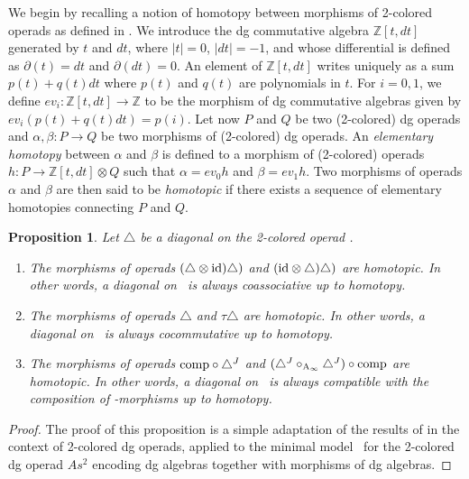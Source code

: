 \documentclass[twoside, 12pt]{amsart}
\newtheorem{proposition}[definition]{Proposition}
\theoremstyle{remark}
\begin{document}
We begin by recalling a notion of homotopy between morphisms of 2-colored operads as defined in \cite[Section 3.10]{MSS}. We introduce the dg commutative algebra $\mathbb{Z}[t,dt]$ generated by $t$ and $dt$, where $|t|=0$, $|dt|=-1$, and whose differential is defined as $\partial (t) = dt$ and $\partial (dt) = 0$. An element of $\mathbb{Z}[t,dt]$ writes uniquely as a sum $p(t)+q(t)dt$ where $p(t)$ and $q(t)$ are polynomials in $t$. For $i=0,1$, we define $ev_i : \mathbb{Z}[t,dt] \rightarrow \mathbb{Z}$ to be the morphism of dg commutative algebras given by $ev_i ( p(t) + q(t)dt ) = p(i)$.
Let now $P$ and $Q$ be two (2-colored) dg operads and $\alpha , \beta : P \rightarrow Q$ be two morphisms of (2-colored) dg operads.
An \textit{elementary homotopy} between $\alpha$ and $\beta$ is defined to a morphism of (2-colored) operads $h : P \rightarrow \mathbb{Z}[t,dt] \otimes Q$ such that $\alpha = ev_0 h$ and $\beta = ev_1 h$.
Two morphisms of operads $\alpha$ and $\beta$ are then said to be \textit{homotopic} if there exists a sequence of elementary homotopies connecting $P$ and $Q$.

\begin{proposition} \label{th:homotopy-properties}
Let $\triangle$ be a diagonal on the 2-colored operad \Ainfdeux . 
\begin{enumerate}
    \item The morphisms of operads $(\triangle \otimes \mathrm{id} ) \triangle)$ and $(\mathrm{id} \otimes \triangle) \triangle)$ are homotopic. In other words, a diagonal on \Ainfdeux\ is always coassociative up to homotopy.
    \item The morphisms of operads $\triangle$ and $\tau \triangle$ are homotopic. In other words, a diagonal on \Ainfdeux\ is always cocommutative up to homotopy.
    \item The morphisms of operads $\mathrm{comp}  \circ \triangle^{J}$ and $( \triangle^{J} \circ_{\mathrm{A}_\infty} \triangle^{J} ) \circ \mathrm{comp}$ are homotopic. In other words, a diagonal on \Ainfdeux\ is always compatible with the composition of \Ainf -morphisms up to homotopy.
\end{enumerate}
\end{proposition}

\begin{proof}
The proof of this proposition is a simple adaptation of the results of \cite[Section 2]{MarklShnider06} in the context of 2-colored dg operads, applied to the minimal model \Ainfdeux\ for the 2-colored dg operad $As^2$ encoding dg algebras together with morphisms of dg algebras.
\end{proof}
\end{document}
